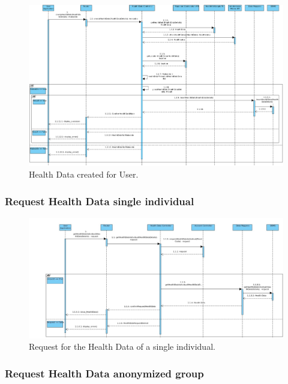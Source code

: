 \documentclass[12pt]{article}
\begin{document}
\begin{figure}[H]
    \centering
    \includegraphics[scale=0.35, angle=-90, origin=c]{createHealthData.png}
    \caption{Health Data created for User.}
    \label{fig:createHealthData}
\end{figure}

\subsubsection{Request Health Data single individual}

\begin{figure}[H]
    \centering
    \includegraphics[scale=0.35, angle=-90, origin=c]{getHealthDataIndividual.jpeg}
    \caption{Request for the Health Data of a single individual.}
    \label{fig:getHealthDataIndividual}
\end{figure}

\subsubsection{Request Health Data anonymized group}
\end{document}

